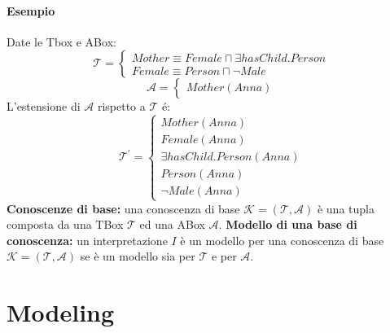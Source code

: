 \documentclass[../main.tex]{subfiles}
\newcommand{\spazio}{\vspace{2em} \newline}
\begin{document}
   \subsubsection{Esempio}
   Date le Tbox e ABox:
   \begin{equation*}
      \mathcal{T}=
      \begin{cases}
         Mother \equiv Female \sqcap \exists hasChild.Person\\
         Female \equiv Person \sqcap \lnot Male
      \end{cases}
   \end{equation*}
   \begin{equation*}
      \mathcal{A}=
      \begin{cases}
         Mother(Anna)
      \end{cases}
   \end{equation*}
   L'estensione di $\mathcal{A}$ rispetto a $\mathcal{T}$ é:
   \begin{equation*}
      \mathcal{T}^\prime=
      \begin{cases}
         Mother(Anna)\\
         Female(Anna)\\
         \exists hasChild.Person(Anna)\\
         Person(Anna)\\
         \lnot Male(Anna) 
      \end{cases}
   \end{equation*}
   \spazio
   \textbf{Conoscenze di base:} una conoscenza di base $\mathcal{K} = (\mathcal{T},\mathcal{A})$ è una tupla composta da una TBox $\mathcal{T}$ ed una ABox $\mathcal{A}$.
   \spazio
   \textbf{Modello di una base di conoscenza:} un interpretazione $I$ è un modello per una conoscenza di base $\mathcal{K} = (\mathcal{T},\mathcal{A})$ se è un modello sia per $\mathcal{T}$ e per $\mathcal{A}$.

   \chapter{Modeling}
\end{document}
